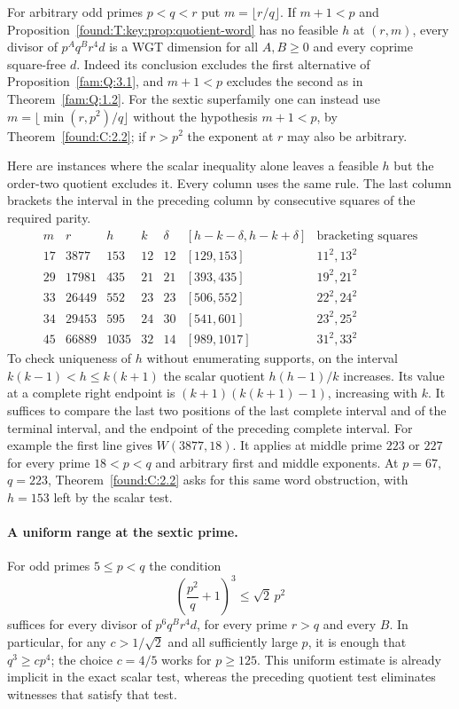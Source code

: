 \documentclass[11pt,a4paper]{article}
\numberwithin{equation}{section}
\theoremstyle{remark}
\begin{document}
For arbitrary odd primes $p<q<r$ put $m=\lfloor r/q\rfloor$. If $m+1<p$ and Proposition~\ref{found:T:key:prop:quotient-word} has no feasible $h$ at $(r,m)$, every divisor of $p^Aq^Br^4d$ is a WGT dimension for all $A,B\ge0$ and every coprime square-free $d$. Indeed its conclusion excludes the first alternative of Proposition~\ref{fam:Q:3.1}, and $m+1<p$ excludes the second as in Theorem~\ref{fam:Q:1.2}. For the sextic superfamily one can instead use $m=\lfloor\min(r,p^2)/q\rfloor$ without the hypothesis $m+1<p$, by Theorem~\ref{found:C:2.2}; if $r>p^2$ the exponent at $r$ may also be arbitrary.

Here are instances where the scalar inequality alone leaves a feasible $h$ but the order-two quotient excludes it. Every column uses the same rule. The last column brackets the interval in the preceding column by consecutive squares of the required parity.
\[
\begin{array}{c|r|r|r|r|c|c}
 m&r&h&k&\delta&[h-k-\delta,h-k+\delta]&\text{bracketing squares}\\\hline
17&3877&153&12&12&[129,153]&11^2,13^2\\
29&17981&435&21&21&[393,435]&19^2,21^2\\
33&26449&552&23&23&[506,552]&22^2,24^2\\
34&29453&595&24&30&[541,601]&23^2,25^2\\
45&66889&1035&32&14&[989,1017]&31^2,33^2
\end{array}
\]
To check uniqueness of $h$ without enumerating supports, on the interval $k(k-1)<h\le k(k+1)$ the scalar quotient $h(h-1)/k$ increases. Its value at a complete right endpoint is $(k+1)(k(k+1)-1)$, increasing with $k$. It suffices to compare the last two positions of the last complete interval and of the terminal interval, and the endpoint of the preceding complete interval. For example the first line gives $W(3877,18)$. It applies at middle prime $223$ or $227$ for every prime $18<p<q$ and arbitrary first and middle exponents. At $p=67$, $q=223$, Theorem~\ref{found:C:2.2} asks for this same word obstruction, with $h=153$ left by the scalar test.

\paragraph{A uniform range at the sextic prime.}
For odd primes $5\le p<q$ the condition
\[
             \left(\frac{p^2}{q}+1\right)^3\le\sqrt2\,p^2
\]
suffices for every divisor of $p^6q^B r^4d$, for every prime $r>q$ and every $B$. In particular, for any $c>1/\sqrt2$ and all sufficiently large $p$, it is enough that $q^3\ge c p^4$; the choice $c=4/5$ works for $p\ge125$. This uniform estimate is already implicit in the exact scalar test, whereas the preceding quotient test eliminates witnesses that satisfy that test.
\end{document}
